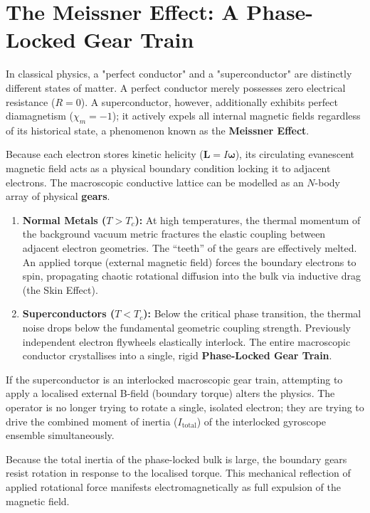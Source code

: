 \section{The Meissner Effect: A Phase-Locked Gear Train}

In classical physics, a "perfect conductor" and a "superconductor" are distinctly different states of matter. A perfect conductor merely possesses zero electrical resistance ($R=0$). A superconductor, however, additionally exhibits perfect diamagnetism ($\chi_m = -1$); it actively expels all internal magnetic fields regardless of its historical state, a phenomenon known as the \textbf{Meissner Effect}.

Because each electron stores kinetic helicity ($\mathbf{L} = I\boldsymbol{\omega}$), its circulating evanescent magnetic field acts as a physical boundary condition locking it to adjacent electrons. The macroscopic conductive lattice can be modelled as an $N$-body array of physical \textbf{gears}.

\begin{enumerate}
    \item \textbf{Normal Metals ($T > T_c$):} At high temperatures, the thermal momentum of the background vacuum metric fractures the elastic coupling between adjacent electron geometries. The ``teeth'' of the gears are effectively melted. An applied torque (external magnetic field) forces the boundary electrons to spin, propagating chaotic rotational diffusion into the bulk via inductive drag (the Skin Effect).
    \item \textbf{Superconductors ($T < T_c$):} Below the critical phase transition, the thermal noise drops below the fundamental geometric coupling strength. Previously independent electron flywheels elastically interlock. The entire macroscopic conductor crystallises into a single, rigid \textbf{Phase-Locked Gear Train}.
\end{enumerate}

If the superconductor is an interlocked macroscopic gear train, attempting to apply a localised external B-field (boundary torque) alters the physics. The operator is no longer trying to rotate a single, isolated electron; they are trying to drive the combined moment of inertia ($I_{\text{total}}$) of the interlocked gyroscope ensemble simultaneously.

Because the total inertia of the phase-locked bulk is large, the boundary gears resist rotation in response to the localised torque. This mechanical reflection of applied rotational force manifests electromagnetically as full expulsion of the magnetic field.


